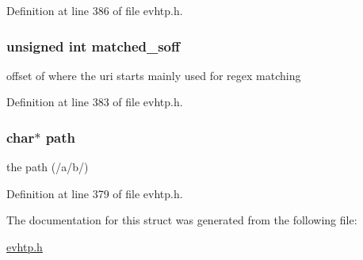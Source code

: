 \-Definition at line 386 of file evhtp.\-h.

\hypertarget{structevhtp__path__s_af11f4fc41ab5561c5d430cedfa5e53d8}{
\subsubsection[{matched\-\_\-soff}]{\setlength{\rightskip}{0pt plus 5cm}unsigned int {\bf matched\-\_\-soff}}}\label{structevhtp__path__s_af11f4fc41ab5561c5d430cedfa5e53d8}
offset of where the uri starts mainly used for regex matching 

\-Definition at line 383 of file evhtp.\-h.

\hypertarget{structevhtp__path__s_a44196e6a5696d10442c29e639437196e}{
\subsubsection[{path}]{\setlength{\rightskip}{0pt plus 5cm}char$\ast$ {\bf path}}}\label{structevhtp__path__s_a44196e6a5696d10442c29e639437196e}
the path (/a/b/) 

\-Definition at line 379 of file evhtp.\-h.



\-The documentation for this struct was generated from the following file\-:\begin{DoxyCompactItemize}
\item 
\hyperlink{evhtp_8h}{evhtp.\-h}\end{DoxyCompactItemize}
